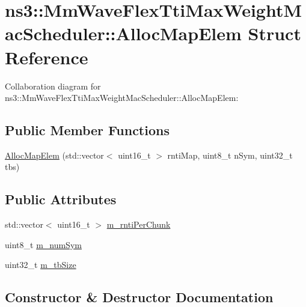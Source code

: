 \hypertarget{structns3_1_1MmWaveFlexTtiMaxWeightMacScheduler_1_1AllocMapElem}{}\section{ns3\+:\+:Mm\+Wave\+Flex\+Tti\+Max\+Weight\+Mac\+Scheduler\+:\+:Alloc\+Map\+Elem Struct Reference}
\label{structns3_1_1MmWaveFlexTtiMaxWeightMacScheduler_1_1AllocMapElem}


Collaboration diagram for ns3\+:\+:Mm\+Wave\+Flex\+Tti\+Max\+Weight\+Mac\+Scheduler\+:\+:Alloc\+Map\+Elem\+:
\subsection*{Public Member Functions}
\begin{DoxyCompactItemize}
\item 
\hyperlink{structns3_1_1MmWaveFlexTtiMaxWeightMacScheduler_1_1AllocMapElem_ade3b59aed14bba37198ebde349542279}{Alloc\+Map\+Elem} (std\+::vector$<$ uint16\+\_\+t $>$ rnti\+Map, uint8\+\_\+t n\+Sym, uint32\+\_\+t tbs)
\end{DoxyCompactItemize}
\subsection*{Public Attributes}
\begin{DoxyCompactItemize}
\item 
std\+::vector$<$ uint16\+\_\+t $>$ \hyperlink{structns3_1_1MmWaveFlexTtiMaxWeightMacScheduler_1_1AllocMapElem_a5d049ac84694957179c2a7a3ea65a55c}{m\+\_\+rnti\+Per\+Chunk}
\item 
uint8\+\_\+t \hyperlink{structns3_1_1MmWaveFlexTtiMaxWeightMacScheduler_1_1AllocMapElem_a88caa6c209013a7853c442520d9771d1}{m\+\_\+num\+Sym}
\item 
uint32\+\_\+t \hyperlink{structns3_1_1MmWaveFlexTtiMaxWeightMacScheduler_1_1AllocMapElem_a1cdeb29a81cb759a17dcda74b10ca1bb}{m\+\_\+tb\+Size}
\end{DoxyCompactItemize}


\subsection{Constructor \& Destructor Documentation}
